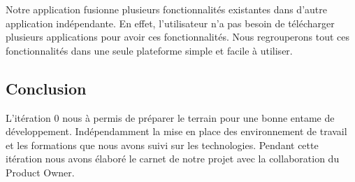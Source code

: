 Notre application fusionne plusieurs fonctionnalités existantes dans d'autre application
indépendante. En effet, l'utilisateur n'a pas besoin de télécharger plusieurs applications
pour avoir ces fonctionnalités.
Nous regrouperons tout ces fonctionnalités dans une seule plateforme simple et facile à
utiliser.

\subsection*{Conclusion}

L'itération 0 nous à permis de préparer le terrain pour une bonne entame de
développement. Indépendamment la mise en place des environnement de travail et
les formations que nous avons suivi sur les technologies. Pendant cette
itération nous avons élaboré le carnet de notre projet avec la collaboration du
Product Owner.
